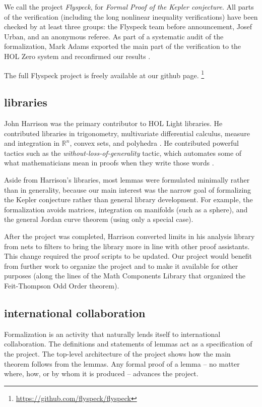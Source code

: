 \documentclass{amsart}
\newcommand{\ring}[1]{\mathbb{#1}}
\begin{document}
We call the project \emph{Flyspeck}, for \emph{Formal Proof of the
  Kepler conjecture}.  All parts of the verification (including the
long nonlinear inequality verifications) have been checked by at least
three groups: the Flyspeck team before announcement, Josef Urban, and
an anonymous referee.  As part of a systematic audit of the
formalization, Mark Adams exported the main part of the verification
to the HOL Zero system and reconfirmed our results
\cite{adams2014flyspecking}.

The full Flyspeck project is freely available at our github page.%
\footnote{\url{https://github.com/flyspeck/flyspeck}}



\subsection{libraries}

John Harrison was the primary contributor to HOL Light libraries.  He
contributed libraries in trigonometry, multivariate differential
calculus, measure and integration in $\ring{R}^n$, convex sets, and
polyhedra \cite{DBLP:journals/jar/Harrison13}.  He contributed
powerful tactics such as the \emph{without-loss-of-generality} tactic,
which automates some of what mathematicians mean in proofs when they
write those words \cite{DBLP:conf/tphol/Harrison09}.

Aside from Harrison's libraries, most lemmas
were formulated minimally rather
than in generality, because our main interest was the narrow
goal of formalizing the Kepler conjecture rather than general
library development.  For example, the formalization avoids matrices,
integration on manifolds (such as a sphere), and the general Jordan
curve theorem (using only a special case).

After the project was completed, Harrison converted limits in his
analysis library from nets to filters to bring the library more in
line with other proof assistants.  This change required the proof
scripts to be updated.
Our project would benefit from further work to organize the project
and to make it available for other purposes (along the lines
of the Math Components Library that organized the Feit-Thompson
Odd Order theorem).

\subsection{international collaboration}

Formalization is an activity that naturally lends itself to
international collaboration.  The definitions and statements of lemmas
act as a specification of the project.  The top-level architecture of
the project shows how the main theorem follows from the lemmas.  Any
formal proof of a lemma -- no matter where, how, or by whom it is
produced -- advances the project.
\end{document}
